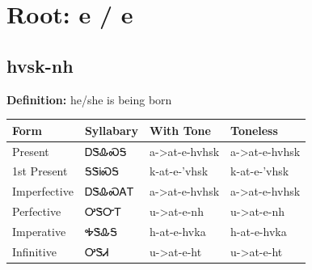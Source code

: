 \documentclass{article}%
\begin{document}
%
\normalsize%
\section*{Root: e / e}%
\subsection*{hvsk-nh}%
\textbf{Definition: }%
he/she is being born%
\\[0.5em]%
\begin{tabular}{|l|l|l|l|}%
\hline%
\textbf{Form}&\textbf{Syllabary}&\textbf{With Tone}&\textbf{Toneless}\\%
\hline%
Present&ᎠᏕᎲᏍᎦ&a{-}>at{-}e{-}hvhsk&a{-}>at{-}e{-}hvhsk\\%
1st Present&ᎦᏕᎥᏍᎦ&k{-}at{-}e{-}'vhsk&k{-}at{-}e{-}'vhsk\\%
Imperfective&ᎠᏕᎲᏍᎪᎢ&a{-}>at{-}e{-}hvhsk&a{-}>at{-}e{-}hvhsk\\%
Perfective&ᎤᏕᏅᎢ&u{-}>at{-}e{-}nh&u{-}>at{-}e{-}nh\\%
Imperative&ᎭᏕᎲᎦ&h{-}at{-}e{-}hvka&h{-}at{-}e{-}hvka\\%
Infinitive&ᎤᏕᏗ&u{-}>at{-}e{-}ht&u{-}>at{-}e{-}ht\\%
\hline%
\end{tabular}%
\\[1em]%
\end{document}
